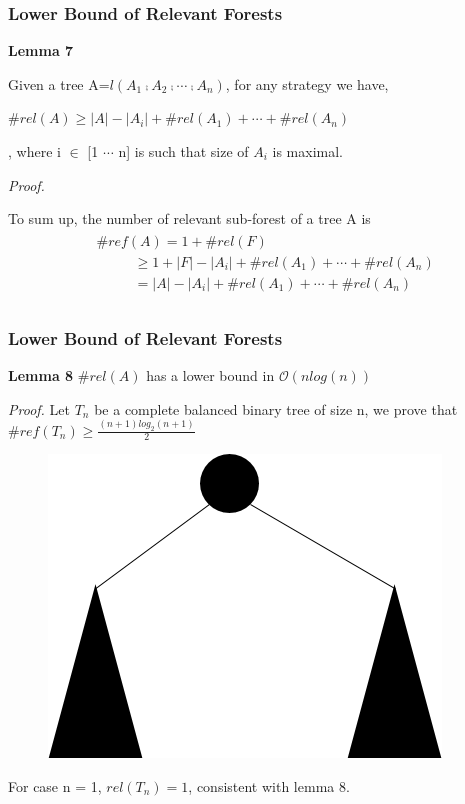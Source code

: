 \documentclass{beamer}
\begin{document}
\begin{frame}
\frametitle{Lower Bound of Relevant Forests}
\textbf{Lemma 7}

Given a tree A=$l(A_1 \comp A_2 \comp \cdots \comp A_n)$, for any strategy we have,

$\#rel(A) \geq \left\vert A \right\vert - \left\vert A_i \right\vert + \#rel(A_1) + \cdots + \#rel(A_n)$

, where i $\in$ [1 $\cdots$ n] is such that size of $A_i$ is maximal.

\vspace{12pt} 
\emph{Proof.}

To sum up, the number of relevant sub-forest of a tree A is 
\begin{eqnarray*}
\begin{split}
&\#ref(A) = 1 + \#rel(F) \\
& \ \ \ \ \ \ \ \ \ \ \ \ \geq 1 + \left\vert F \right\vert - \left\vert A_i \right\vert +\#rel(A_1) + \cdots + \#rel(A_n) \\
& \ \ \ \ \ \ \ \ \ \ \ \ = \left\vert A \right\vert - \left\vert A_i \right\vert + \#rel(A_1) + \cdots + \#rel(A_n) \\
\end{split}
\end{eqnarray*}
\end{frame}

\begin{frame}
\frametitle{Lower Bound of Relevant Forests}
\textbf{Lemma 8}
$\#rel(A)$ has a lower bound in $\mathcal{O}(nlog(n))$

\vspace{12pt} 
\emph{Proof.}
Let $T_n$ be a complete balanced binary tree of size n, we prove that $\#ref(T_n) \geq \frac{(n+1)log_2(n+1)}{2}$
\begin{figure}
	\includegraphics[width=0.3\linewidth]{completebinarytree}
	\label{Complete Binary Tree}
	\centering
\end{figure}

For case n = 1, $rel(T_n) = 1$, consistent with lemma 8.
\end{frame}
\end{document}
